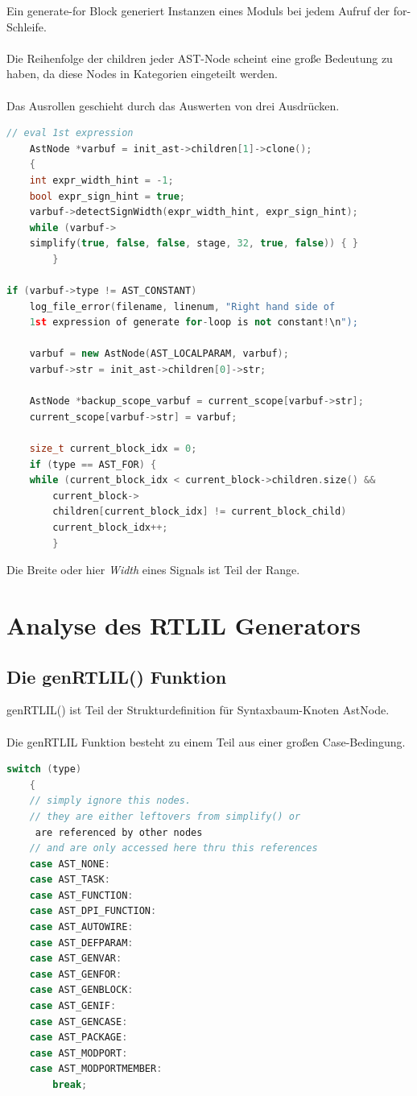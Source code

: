 \documentclass[11pt]{report}
\begin{document}
Ein generate-for Block generiert Instanzen eines Moduls bei jedem Aufruf der for-Schleife.\\
\\
Die Reihenfolge der children jeder AST-Node scheint eine große Bedeutung zu haben, da diese Nodes in Kategorien eingeteilt werden.
\\
\\
Das Ausrollen geschieht durch das Auswerten von drei Ausdrücken.
\begin{lstlisting}[language=C++]
	// eval 1st expression
	AstNode *varbuf = init_ast->children[1]->clone();
	{
	int expr_width_hint = -1;
	bool expr_sign_hint = true;
	varbuf->detectSignWidth(expr_width_hint, expr_sign_hint);
	while (varbuf->
	simplify(true, false, false, stage, 32, true, false)) { }
		}

if (varbuf->type != AST_CONSTANT)
	log_file_error(filename, linenum, "Right hand side of 
	1st expression of generate for-loop is not constant!\n");

	varbuf = new AstNode(AST_LOCALPARAM, varbuf);
	varbuf->str = init_ast->children[0]->str;

	AstNode *backup_scope_varbuf = current_scope[varbuf->str];
	current_scope[varbuf->str] = varbuf;

	size_t current_block_idx = 0;
	if (type == AST_FOR) {
	while (current_block_idx < current_block->children.size() &&
		current_block->
		children[current_block_idx] != current_block_child)
		current_block_idx++;
		}
\end{lstlisting}

Die Breite oder hier \textit{Width} eines Signals ist Teil der Range.



\section{Analyse des RTLIL Generators}
\subsection{Die genRTLIL() Funktion}
genRTLIL() ist Teil der Strukturdefinition für Syntaxbaum-Knoten AstNode. 
\\
\\
Die genRTLIL Funktion besteht zu einem Teil aus einer großen Case-Bedingung.

\begin{lstlisting}[language=C++]
	switch (type)
	{
	// simply ignore this nodes.
	// they are either leftovers from simplify() or
	 are referenced by other nodes
	// and are only accessed here thru this references
	case AST_NONE:
	case AST_TASK:
	case AST_FUNCTION:
	case AST_DPI_FUNCTION:
	case AST_AUTOWIRE:
	case AST_DEFPARAM:
	case AST_GENVAR:
	case AST_GENFOR:
	case AST_GENBLOCK:
	case AST_GENIF:
	case AST_GENCASE:
	case AST_PACKAGE:
	case AST_MODPORT:
	case AST_MODPORTMEMBER:
		break;
\end{lstlisting}
\end{document}

